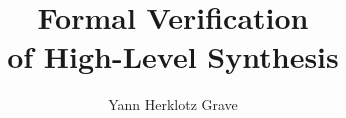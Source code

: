 \documentclass[
  fontsize=12pt,
  twoside=semi,
  bibliography=totoc,
  DIV=11,
  ]{scrbook}
\title{Formal Verification \\ of High-Level Synthesis}
\author{Yann Herklotz Grave}
\begin{document}










\glsresetall


















\end{document}
